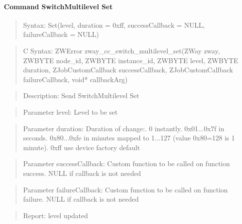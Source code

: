 \paragraph{Command SwitchMultilevel Set}
\begin{quote}Syntax: Set(level, duration = 0xff, successCallback = NULL, failureCallback = NULL)\end{quote}
\begin{quote}C Syntax: ZWError zway\_cc\_switch\_multilevel\_set(ZWay zway, ZWBYTE node\_id, ZWBYTE instance\_id, ZWBYTE level, ZWBYTE duration, ZJobCustomCallback successCallback, ZJobCustomCallback failureCallback, void* callbackArg)\end{quote}
\begin{quote}Description: Send SwitchMultilevel Set\end{quote}
\begin{quote}Parameter level: Level to be set\end{quote}
\begin{quote}Parameter duration: Duration of change:. 0 instantly. 0x01...0x7f in seconds. 0x80...0xfe in minutes mapped to 1...127 (value 0x80=128 is 1 minute). 0xff use device factory default\end{quote}
\begin{quote}Parameter successCallback: Custom function to be called on function success. NULL if callback is not needed\end{quote}
\begin{quote}Parameter failureCallback: Custom function to be called on function failure. NULL if callback is not needed\end{quote}
\begin{quote}Report: level updated\end{quote}


